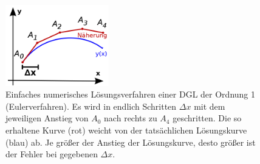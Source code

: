 \begin{figure}[ht]
	\centering
	\includegraphics[width=0.4\textwidth]{../tex-snippets/ex-ode-slope-field-1-img-b.png}
	\caption{Einfaches numerisches Lösungsverfahren einer DGL der Ordnung 1 (Eulerverfahren). Es wird in endlich Schritten $\Delta x$ mit dem jeweiligen Anstieg von $A_0$ nach rechts zu $A_4$ geschritten. Die so erhaltene Kurve (rot) weicht von der tatsächlichen Lösungskurve (blau) ab. Je größer der Anstieg der Lösungskurve, desto größer ist der Fehler bei gegebenen $\Delta x$.}
	\label{ex-ode-slope-field-1-img-b}
\end{figure}


